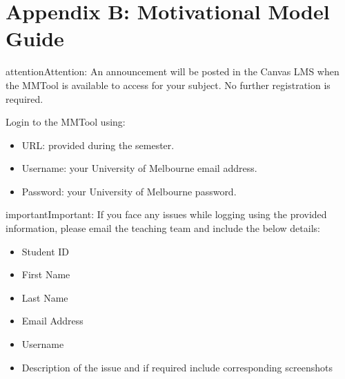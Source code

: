 \documentclass[letterpaper,10pt,english]{jupyterBook}
\begin{document}
\chapter{Appendix B: Motivational Model Guide}
\label{\detokenize{appendices/appendix_b/motivational_model_guide:appendix-b-motivational-model-guide}}\label{\detokenize{appendices/appendix_b/motivational_model_guide::doc}}
\begin{sphinxadmonition}{attention}{Attention:}
\sphinxAtStartPar
An announcement will be posted in the Canvas LMS when the MMTool is
available to access for your subject. No further registration is
required.
\end{sphinxadmonition}

\sphinxAtStartPar
Login to the MMTool using:
\begin{itemize}
\item {} 
\sphinxAtStartPar
URL: provided during the semester.

\item {} 
\sphinxAtStartPar
Username: your University of Melbourne email address.

\item {} 
\sphinxAtStartPar
Password: your University of Melbourne password.

\end{itemize}

\begin{sphinxadmonition}{important}{Important:}
\sphinxAtStartPar
If you face any issues while logging using the provided information,
please email the teaching team and include the below details:
\begin{itemize}
\item {} 
\sphinxAtStartPar
Student ID

\item {} 
\sphinxAtStartPar
First Name

\item {} 
\sphinxAtStartPar
Last Name

\item {} 
\sphinxAtStartPar
Email Address

\item {} 
\sphinxAtStartPar
Username

\item {} 
\sphinxAtStartPar
Description of the issue and if required include corresponding
screenshots

\end{itemize}
\end{sphinxadmonition}
\end{document}
